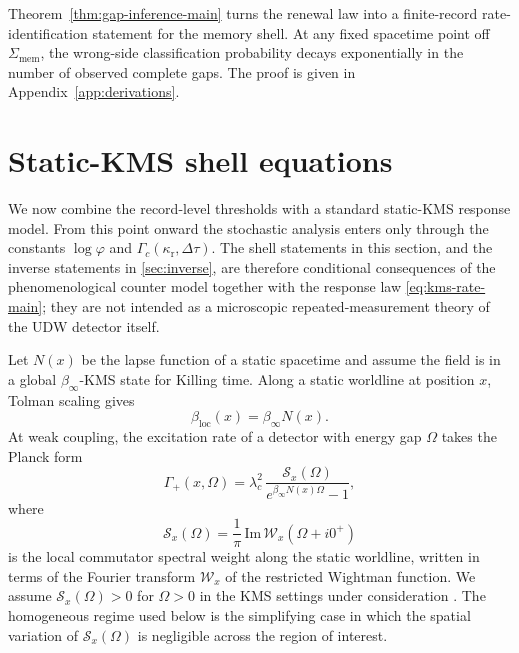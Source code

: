 \documentclass[11pt]{article}
\theoremstyle{definition}
\begin{document}
Theorem~\ref{thm:gap-inference-main} turns the renewal law into a finite-record rate-identification statement for the memory shell. At any fixed spacetime point off $\Sigma_{\mathrm{mem}}$, the wrong-side classification probability decays exponentially in the number of observed complete gaps. The proof is given in Appendix~\ref{app:derivations}.

\section{Static-KMS shell equations}\label{sec:kms-shells}

We now combine the record-level thresholds with a standard static-KMS response model. From this point onward the stochastic analysis enters only through the constants $\log\varphi$ and $\Gamma_c(\kappa_{\mathrm r},\Delta\tau)$. The shell statements in this section, and the inverse statements in \cref{sec:inverse}, are therefore conditional consequences of the phenomenological counter model together with the response law \eqref{eq:kms-rate-main}; they are not intended as a microscopic repeated-measurement theory of the UDW detector itself.

Let $N(x)$ be the lapse function of a static spacetime and assume the field is in a global $\beta_\infty$-KMS state for Killing time. Along a static worldline at position $x$, Tolman scaling gives \cite{Tolman1930}
\begin{equation}\label{eq:tolman-main}
\beta_{\mathrm{loc}}(x)=\beta_\infty N(x).
\end{equation}
At weak coupling, the excitation rate of a detector with energy gap $\Omega$ takes the Planck form
\begin{equation}\label{eq:kms-rate-main}
\Gamma_+(x,\Omega)=
\lambda_c^2\,
\frac{\mathcal S_x(\Omega)}{e^{\beta_\infty N(x)\Omega}-1},
\end{equation}
where
\[
\mathcal S_x(\Omega)=\frac{1}{\pi}\,\mathrm{Im}\,\mathcal W_x(\Omega+i0^+)
\]
is the local commutator spectral weight along the static worldline, written in terms of the Fourier transform $\mathcal W_x$ of the restricted Wightman function. We assume $\mathcal S_x(\Omega)>0$ for $\Omega>0$ in the KMS settings under consideration \cite{KayWald1991}. The homogeneous regime used below is the simplifying case in which the spatial variation of $\mathcal S_x(\Omega)$ is negligible across the region of interest.
\end{document}
